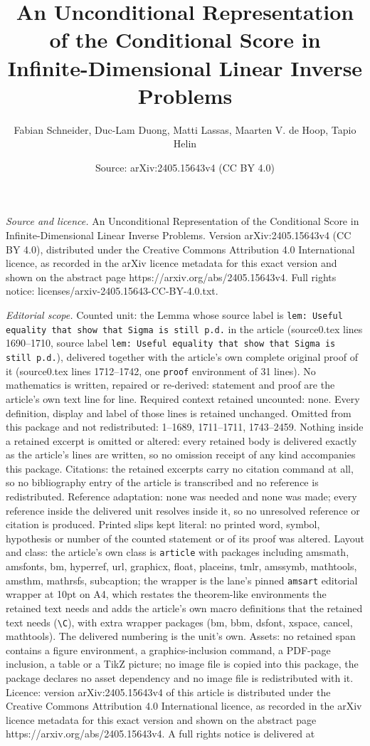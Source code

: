 \documentclass[10pt,a4paper]{amsart}
\title[An Unconditional Representation of the Conditional Score in ]{An Unconditional Representation of the Conditional Score in Infinite-Dimensional Linear Inverse Problems}
\author{Fabian Schneider, Duc-Lam Duong, Matti Lassas, Maarten V. de Hoop, Tapio Helin}
\date{Source: arXiv:2405.15643v4 (CC BY 4.0)}
\begin{document}
\maketitle

\noindent\emph{Source and licence.} An Unconditional Representation of the Conditional Score in Infinite-Dimensional Linear Inverse Problems. Version arXiv:2405.15643v4 (CC BY 4.0), distributed under the Creative Commons Attribution 4.0 International licence, as recorded in the arXiv licence metadata for this exact version and shown on the abstract page https://arxiv.org/abs/2405.15643v4. Full rights notice: licenses/arxiv-2405.15643-CC-BY-4.0.txt.\par\smallskip

\noindent\textit{Editorial scope.} Counted unit: the Lemma whose source label is \texttt{lem: Useful equality that show that Sigma is still p.d.} in the article (source0.tex lines 1690--1710, source label \texttt{lem: Useful equality that show that Sigma is still p.d.}), delivered together with the article's own complete original proof of it (source0.tex lines 1712--1742, one \texttt{proof} environment of 31 lines). No mathematics is written, repaired or re-derived: statement and proof are the article's own text line for line. Required context retained uncounted: none. Every definition, display and label of those lines is retained unchanged. Omitted from this package and not redistributed: 1--1689, 1711--1711, 1743--2459. Nothing inside a retained excerpt is omitted or altered: every retained body is delivered exactly as the article's lines are written, so no omission receipt of any kind accompanies this package. Citations: the retained excerpts carry no citation command at all, so no bibliography entry of the article is transcribed and no reference is redistributed. Reference adaptation: none was needed and none was made; every reference inside the delivered unit resolves inside it, so no unresolved reference or citation is produced. Printed slips kept literal: no printed word, symbol, hypothesis or number of the counted statement or of its proof was altered. Layout and class: the article's own class is \texttt{article} with packages including amsmath, amsfonts, bm, hyperref, url, graphicx, float, placeins, tmlr, amssymb, mathtools, amsthm, mathrsfs, subcaption; the wrapper is the lane's pinned \texttt{amsart} editorial wrapper at 10pt on A4, which restates the theorem-like environments the retained text needs and adds the article's own macro definitions that the retained text needs (\texttt{\textbackslash C}), with extra wrapper packages (bm, bbm, dsfont, xspace, cancel, mathtools). The delivered numbering is the unit's own. Assets: no retained span contains a figure environment, a graphics-inclusion command, a PDF-page inclusion, a table or a TikZ picture; no image file is copied into this package, the package declares no asset dependency and no image file is redistributed with it. Licence: version arXiv:2405.15643v4 of this article is distributed under the Creative Commons Attribution 4.0 International licence, as recorded in the arXiv licence metadata for this exact version and shown on the abstract page https://arxiv.org/abs/2405.15643v4. A full rights notice is delivered at 
\end{document}
